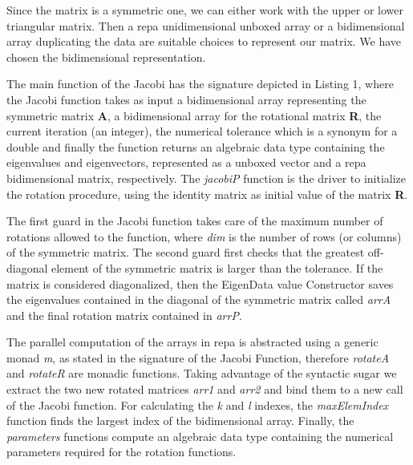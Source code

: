 \documentclass{tmr}
\begin{document}
Since the matrix is a symmetric one, we can either work with the upper or lower
triangular matrix. Then a repa unidimensional unboxed array or a bidimensional array
 duplicating the data are suitable choices to represent our matrix. 
We have chosen the bidimensional representation.

The main function of the Jacobi has the signature depicted in Listing 1, where the Jacobi function takes as
input a bidimensional array representing the symmetric matrix {\textbf A}, a bidimensional
array for the rotational matrix {\textbf R}, the current iteration (an integer),
the numerical tolerance which is a synonym for a double and
finally the function returns an algebraic data type containing the eigenvalues
and eigenvectors, represented as a unboxed vector and a repa bidimensional matrix, respectively.
The \textit{jacobiP} function is the driver to initialize the rotation procedure, using
the identity matrix as initial value of the matrix \textbf{R}. 

The first guard in the Jacobi function takes care of the maximum number of rotations allowed
to the function, where \textit{dim} is the number of rows (or columns) of the symmetric matrix.
The second guard first checks that the greatest off-diagonal element of the symmetric
matrix is larger than the tolerance. If the matrix is considered diagonalized, then the 
EigenData value Constructor saves the eigenvalues contained in the diagonal of the symmetric
matrix called \textit{arrA} and the final rotation matrix contained in \textit{arrP}.

The parallel computation of the arrays in repa is abstracted using a generic 
monad \textit{m}, as stated in the signature of the Jacobi Function,
therefore \textit{rotateA} and \textit{rotateR} are monadic functions. Taking
advantage of the syntactic sugar we extract the two new rotated matrices \textit{arr1} and
\textit{arr2} and bind them to a new call of the Jacobi function.
For calculating the \textit{k} and \textit{l} indexes, the \textit{maxElemIndex} function
finds the largest index of the bidimensional array. Finally, the \textit{parameters} functions
compute an algebraic data type containing the numerical parameters required for the rotation functions. 
\end{document}
